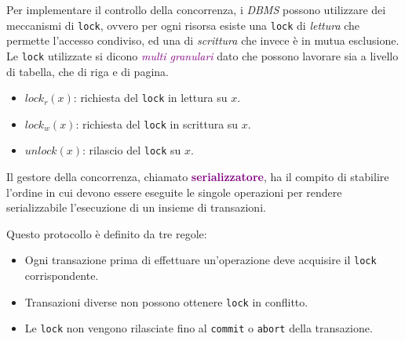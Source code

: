 Per implementare il controllo della concorrenza, i \emph{DBMS} possono
utilizzare dei meccanismi di \verb|lock|, ovvero per ogni risorsa
esiste una \verb|lock| di \emph{lettura} che permette l'accesso condiviso,
ed una di \emph{scrittura} che invece è in mutua esclusione. Le \verb|lock|
utilizzate si dicono \emph{\textcolor{purple}{multi granulari}} dato che possono
lavorare sia a livello di tabella, che di riga e di pagina.
\begin{itemize}
    \item $lock_{r}(x)$: richiesta del \verb|lock| in lettura su $x$.
    \item $lock_{w}(x)$: richiesta del \verb|lock| in scrittura su $x$.
    \item $unlock(x)$: rilascio del \verb|lock| su $x$.
\end{itemize}

Il gestore della concorrenza, chiamato \textbf{\textcolor{purple}{serializzatore}},
ha il compito di stabilire l'ordine in cui devono essere eseguite le singole operazioni
per rendere serializzabile l'esecuzione di un insieme di transazioni.

\begin{definition}
    Questo protocollo è definito da tre regole:
    \begin{itemize}
        \item Ogni transazione prima di effettuare un'operazione deve acquisire
            il \verb|lock| corrispondente.
        \item Transazioni diverse non possono ottenere \verb|lock| in conflitto.
        \item Le \verb|lock| non vengono rilasciate fino al \verb|commit| o \verb|abort| della transazione.
    \end{itemize}
\end{definition}

